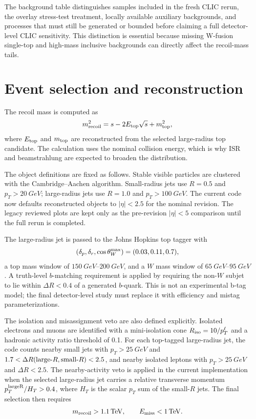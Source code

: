 \documentclass[a4paper,11pt]{article}
\begin{document}


The background table distinguishes samples included in the fresh CLIC rerun,
the overlay stress-test treatment, locally available auxiliary backgrounds, and
processes that must still be generated or bounded before claiming a full
detector-level CLIC sensitivity.  This distinction is essential because missing
W-fusion single-top and high-mass inclusive backgrounds can directly affect the
recoil-mass tails.

\section{Event selection and reconstruction}
\label{sec:selection}

The recoil mass is computed as
\begin{equation}
  m_{\rm recoil}^{2}
  = s - 2 E_{\rm top}\sqrt{s} + m_{\rm top}^{2},
  \label{eq:recoilmass}
\end{equation}
where $E_{\rm top}$ and $m_{\rm top}$ are reconstructed from the selected
large-radius top candidate.  The calculation uses the nominal collision energy,
which is why ISR and beamstrahlung are expected to broaden the distribution.

The object definitions are fixed as follows.  Stable visible particles are
clustered with the Cambridge--Aachen algorithm.  Small-radius jets use $R=0.5$
and $p_T>\SI{20}{GeV}$; large-radius jets use $R=1.0$ and
$p_T>\SI{100}{GeV}$.  The current code now defaults reconstructed objects to
$|\eta|<2.5$ for the nominal revision.  The legacy reviewed plots are kept only
as the pre-revision $|\eta|<5$ comparison until the full rerun is completed.

The large-radius jet is passed to the Johns Hopkins top tagger
\cite{Kaplan:2008ie} with
\[
  (\delta_p,\delta_r,\cos\theta_W^{\rm max})=(0.03,0.11,0.7),
\]
a top mass window of $\SIrange{150}{200}{GeV}$, and a $W$ mass window of
$\SIrange{65}{95}{GeV}$.  A truth-level $b$-matching requirement is applied by
requiring the non-$W$ subjet to lie within $\Delta R<0.4$ of a generated
$b$-quark.  This is not an experimental b-tag model; the final detector-level
study must replace it with efficiency and mistag parameterizations.

The isolation and misassignment veto are also defined explicitly.  Isolated
electrons and muons are identified with a mini-isolation cone
$R_{\rm iso}=10/p_T^\ell$ and a hadronic activity ratio threshold of 0.1.
For each top-tagged large-radius jet, the code counts nearby small jets with
$p_T>\SI{25}{GeV}$ and $1.7<\Delta R({\rm large}\mbox{-}R,{\rm small}\mbox{-}R)<2.5$,
and nearby isolated leptons with $p_T>\SI{25}{GeV}$ and $\Delta R<2.5$.
The nearby-activity veto is applied in the current implementation when the
selected large-radius jet carries a relative transverse momentum
$p_T^{\rm largeR}/H_T>0.4$, where $H_T$ is the scalar $p_T$ sum of the small-$R$
jets.  The final selection then requires
\[
  m_{\rm recoil}>\SI{1.1}{TeV},\qquad E_{\rm miss}<\SI{1}{TeV}.
\]
\end{document}
